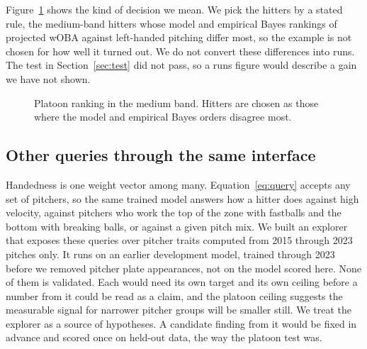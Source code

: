 \documentclass[11pt,letterpaper]{article}
\begin{document}
Figure~\ref{fig:case} shows the kind of decision we mean. We pick the hitters by a stated rule, the medium-band hitters whose model and empirical Bayes rankings of projected wOBA against left-handed pitching differ most, so the example is not chosen for how well it turned out. We do not convert these differences into runs. The test in Section~\ref{sec:test} did not pass, so a runs figure would describe a gain we have not shown.

\begin{figure}[t]
\centering
{}
\caption{Platoon ranking in the medium band. Hitters are chosen as those where the model and empirical Bayes orders disagree most.}
\label{fig:case}
\end{figure}

\subsection{Other queries through the same interface}
\label{sec:otherqueries}

Handedness is one weight vector among many. Equation~\ref{eq:query} accepts any set of pitchers, so the same trained model answers how a hitter does against high velocity, against pitchers who work the top of the zone with fastballs and the bottom with breaking balls, or against a given pitch mix. We built an explorer that exposes these queries over pitcher traits computed from 2015 through 2023 pitches only. It runs on an earlier development model, trained through 2023 before we removed pitcher plate appearances, not on the model scored here. None of them is validated. Each would need its own target and its own ceiling before a number from it could be read as a claim, and the platoon ceiling suggests the measurable signal for narrower pitcher groups will be smaller still. We treat the explorer as a source of hypotheses. A candidate finding from it would be fixed in advance and scored once on held-out data, the way the platoon test was.
\end{document}
